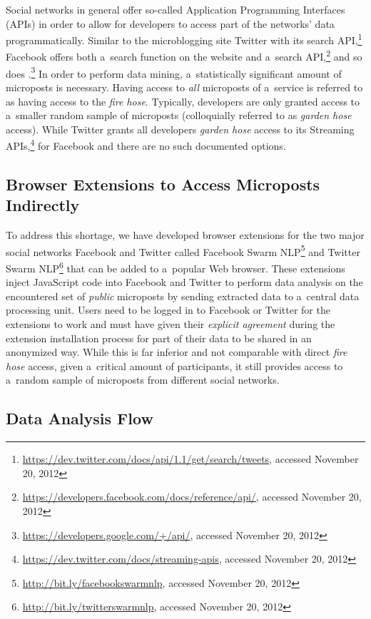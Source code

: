 Social networks in general offer so-called
Application Programming Interfaces (APIs)
in order to allow for developers to access
part of the networks' data programmatically.
Similar to the microblogging site Twitter
with its search
API,\footnote{\url{https://dev.twitter.com/docs/api/1.1/get/search/tweets},
accessed November 20, 2012}
Facebook offers both a~search function on the website
and a~search
API,\footnote{\url{https://developers.facebook.com/docs/reference/api/},
accessed November 20, 2012}
and so does
\googleplus.\footnote{\url{https://developers.google.com/+/api/},
accessed November 20, 2012}
In order to perform data mining,
a~statistically significant amount of microposts is necessary.
Having access to \emph{all} microposts of a~service is referred to as
having access to the \emph{fire hose}.
Typically, developers are only granted access to a~smaller random 
sample of microposts (colloquially referred to as \emph{garden hose} access).
While Twitter grants all developers \emph{garden hose} access to its Streaming
APIs,\footnote{\url{https://dev.twitter.com/docs/streaming-apis},
accessed November 20, 2012}
for Facebook and \googleplus there are no such documented options.

\subsection{Browser Extensions to Access Microposts Indirectly}

To address this shortage, we have developed browser extensions
for the two major social networks Facebook and Twitter
called Facebook Swarm
NLP\footnote{\url{http://bit.ly/facebookswarmnlp},
accessed November 20, 2012}
and Twitter Swarm
NLP\footnote{\url{http://bit.ly/twitterswarmnlp},
accessed November 20, 2012}
that can be added to a~popular Web browser.
These extensions inject JavaScript code into Facebook and
Twitter to perform data analysis on the encountered set of
\emph{public} microposts by sending extracted data
to a~central data processing unit.
Users need to be logged in to Facebook or Twitter for the 
extensions to work and must have given
their \emph{explicit agreement} during
the extension installation process
for part of their data to be shared in an anonymized way.
While this is far inferior and not comparable
with direct \emph{fire hose} access,
given a~critical amount of participants,
it still provides access to a~random sample of microposts
from different social networks.

\subsection{Data Analysis Flow}

